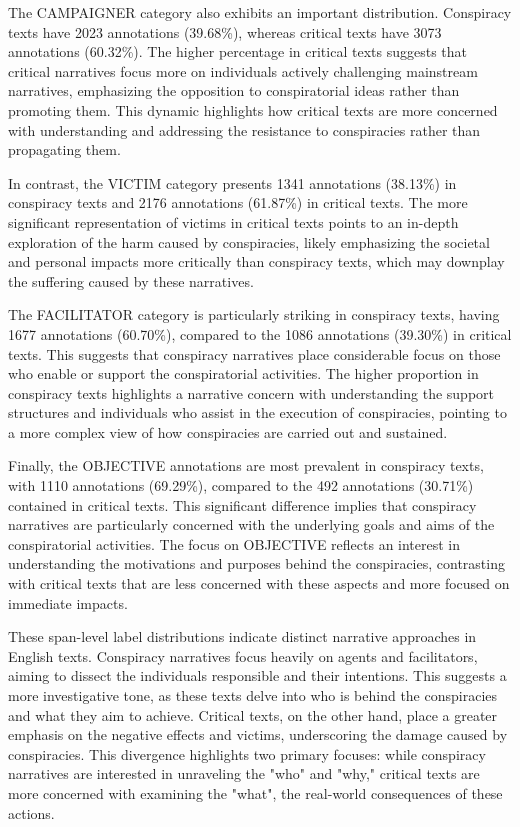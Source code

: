 \documentclass{Configuration_Files/PoliMi3i_thesis}
\begin{document}
The CAMPAIGNER category also exhibits an important distribution. Conspiracy texts have 2023 annotations (39.68\%), whereas critical texts have 3073 annotations (60.32\%). The higher percentage in critical texts suggests that critical narratives focus more on individuals actively challenging mainstream narratives, emphasizing the opposition to conspiratorial ideas rather than promoting them. This dynamic highlights how critical texts are more concerned with understanding and addressing the resistance to conspiracies rather than propagating them.

In contrast, the VICTIM category presents 1341 annotations (38.13\%) in conspiracy texts and 2176 annotations (61.87\%) in critical texts. The more significant representation of victims in critical texts points to an in-depth exploration of the harm caused by conspiracies, likely emphasizing the societal and personal impacts more critically than conspiracy texts, which may downplay the suffering caused by these narratives.

The FACILITATOR category is particularly striking in conspiracy texts, having 1677 annotations (60.70\%), compared to the 1086 annotations (39.30\%) in critical texts. This suggests that conspiracy narratives place considerable focus on those who enable or support the conspiratorial activities. The higher proportion in conspiracy texts highlights a narrative concern with understanding the support structures and individuals who assist in the execution of conspiracies, pointing to a more complex view of how conspiracies are carried out and sustained.

Finally, the OBJECTIVE annotations are most prevalent in conspiracy texts, with 1110 annotations (69.29\%), compared to the 492 annotations (30.71\%) contained in critical texts. This significant difference implies that conspiracy narratives are particularly concerned with the underlying goals and aims of the conspiratorial activities. The focus on OBJECTIVE reflects an interest in understanding the motivations and purposes behind the conspiracies, contrasting with critical texts that are less concerned with these aspects and more focused on immediate impacts.

These span-level label distributions indicate distinct narrative approaches in English texts. Conspiracy narratives focus heavily on agents and facilitators, aiming to dissect the individuals responsible and their intentions. This suggests a more investigative tone, as these texts delve into who is behind the conspiracies and what they aim to achieve. Critical texts, on the other hand, place a greater emphasis on the negative effects and victims, underscoring the damage caused by conspiracies. This divergence highlights two primary focuses: while conspiracy narratives are interested in unraveling the "who" and "why," critical texts are more concerned with examining the "what", the real-world consequences of these actions.
\end{document}
